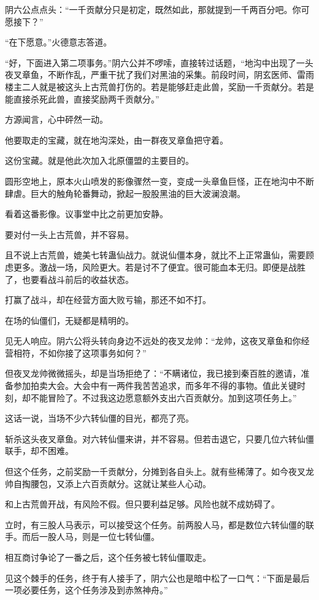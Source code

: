 \begin{this_body}
阴六公点点头：“一千贡献分只是初定，既然如此，那就提到一千两百分吧。你可愿接下？”

“在下愿意。”火德意志答道。

“好，下面进入第二项事务。”阴六公并不啰嗦，直接转过话题，“地沟中出现了一头夜叉章鱼，不断作乱，严重干扰了我们对黑油的采集。前段时间，阴玄医师、雷雨楼主二人就是被这头上古荒兽打伤的。若是能够赶走此兽，奖励一千贡献分。若是能直接杀死此兽，直接奖励两千贡献分。”

方源闻言，心中砰然一动。

他要取走的宝藏，就在地沟深处，由一群夜叉章鱼把守着。

这份宝藏。就是他此次加入北原僵盟的主要目的。

圆形空地上，原本火山喷发的影像骤然一变，变成一头章鱼巨怪，正在地沟中不断肆虐。巨大的触角轮番舞动，掀起一股股黑油的巨大波澜浪潮。

看着这番影像。议事堂中比之前更加安静。

要对付一头上古荒兽，并不容易。

且不说上古荒兽，媲美七转蛊仙战力。就说仙僵本身，就比不上正常蛊仙，需要顾虑更多。激战一场，风险更大。若是讨不了便宜。很可能血本无归。即便是战胜了，也要看战斗前后的收益状态。

打赢了战斗，却在经营方面大败亏输，那还不如不打。

在场的仙僵们，无疑都是精明的。

见无人响应。阴六公将头转向身边不远处的夜叉龙帅：“龙帅，这夜叉章鱼和你经营相符，不如你接了这项事务如何？”

但夜叉龙帅微微摇头，却是当场拒绝了：“不瞒诸位，我已接到秦百胜的邀请，准备参加拍卖大会。大会中有一两件我苦苦追求，而多年不得的事物。值此关键时刻，却不能冒险了。不过我这边愿意额外支出六百贡献分。加到这项任务上。”

这话一说，当场不少六转仙僵的目光，都亮了亮。

斩杀这头夜叉章鱼。对六转仙僵来讲，并不容易。但若击退它，只要几位六转仙僵联手，却不困难。

但这个任务，之前奖励一千贡献分，分摊到各自头上。就有些稀薄了。如今夜叉龙帅自掏腰包，又添上六百贡献分。这就让某些人心动。

和上古荒兽开战，有风险不假。但只要利益足够。风险也就不成妨碍了。

立时，有三股人马表示，可以接受这个任务。前两股人马，都是数位六转仙僵的联手。而后一股人马，则是一位七转仙僵。

相互商讨争论了一番之后，这个任务被七转仙僵取走。

见这个棘手的任务，终于有人接手了，阴六公也是暗中松了一口气：“下面是最后一项必要任务，这个任务涉及到赤煞神舟。”


\end{this_body}
